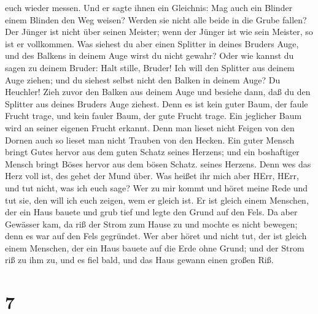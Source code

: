 euch wieder messen.  Und er sagte ihnen ein Gleichnis: Mag
auch ein Blinder einem Blinden den Weg weisen? Werden sie nicht alle
beide in die Grube fallen?  Der Jünger ist nicht über
seinen Meister; wenn der Jünger ist wie sein Meister, so ist er
vollkommen.  Was siehest du aber einen Splitter in deines
Bruders Auge, und des Balkens in deinem Auge wirst du nicht gewahr?
 Oder wie kannst du sagen zu deinem Bruder: Halt stille,
Bruder! Ich will den Splitter aus deinem Auge ziehen; und du siehest
selbst nicht den Balken in deinem Auge? Du Heuchler! Zieh zuvor den
Balken aus deinem Auge und besiehe dann, daß du den Splitter aus deines
Bruders Auge ziehest.  Denn es ist kein guter Baum, der
faule Frucht trage, und kein fauler Baum, der gute Frucht trage.
 Ein jeglicher Baum wird an seiner eigenen Frucht erkannt.
Denn man lieset nicht Feigen von den Dornen auch so lieset man nicht
Trauben von den Hecken.  Ein guter Mensch bringt Gutes
hervor aus dem guten Schatz seines Herzens; und ein boshaftiger Mensch
bringt Böses hervor aus dem bösen Schatz. seines Herzens. Denn wes das
Herz voll ist, des gehet der Mund über.  Was heißet ihr
mich aber HErr, HErr, und tut nicht, was ich euch sage? 
Wer zu mir kommt und höret meine Rede und tut sie, den will ich euch
zeigen, wem er gleich ist.  Er ist gleich einem Menschen,
der ein Haus bauete und grub tief und legte den Grund auf den Fels. Da
aber Gewässer kam, da riß der Strom zum Hause zu und mochte es nicht
bewegen; denn es war auf den Fels gegründet.  Wer aber
höret und nicht tut, der ist gleich einem Menschen, der ein Haus bauete
auf die Erde ohne Grund; und der Strom riß zu ihm zu, und es fiel bald,
und das Haus gewann einen großen Riß.

\hypertarget{section-6}{%
\section{7}\label{section-6}}

